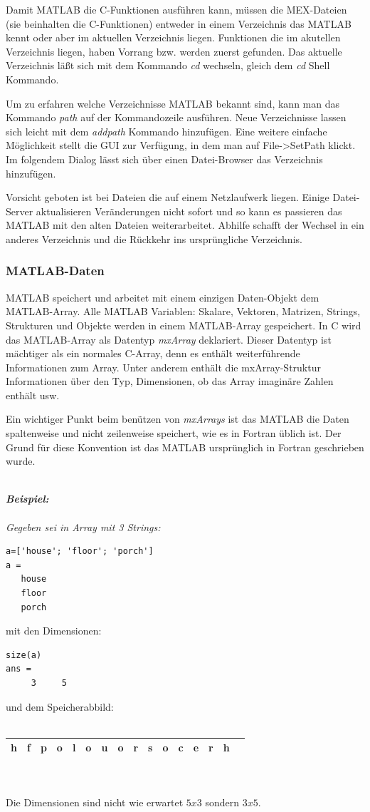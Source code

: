 \documentclass[10pt, bigheadings]{scrartcl}
\begin{document}
Damit MATLAB die C-Funktionen ausführen kann, müssen die MEX-Dateien
(sie beinhalten die C-Funktionen) entweder in einem Verzeichnis das
MATLAB kennt oder aber im aktuellen Verzeichnis liegen. Funktionen die
im akutellen Verzeichnis liegen, haben Vorrang bzw. werden zuerst
gefunden. Das aktuelle Verzeichnis läßt sich mit dem Kommando \textit{cd}
wechseln, gleich dem \textit{cd} Shell Kommando.

Um zu erfahren welche Verzeichnisse MATLAB bekannt sind, kann man das
Kommando \textit{path} auf der Kommandozeile ausführen. Neue Verzeichnisse
lassen sich leicht mit dem \textit{addpath} Kommando hinzufügen. Eine
weitere einfache Möglichkeit stellt die GUI zur Verfügung, in dem man 
auf File->SetPath klickt. Im folgendem Dialog lässt sich über einen 
Datei-Browser das Verzeichnis hinzufügen. 	

Vorsicht geboten ist bei Dateien die auf einem Netzlaufwerk liegen. Einige
Datei-Server aktualisieren  Veränderungen nicht sofort und so kann es passieren
das MATLAB mit den alten Dateien weiterarbeitet. Abhilfe schafft der Wechsel
in ein anderes Verzeichnis und die Rückkehr ins ursprüngliche Verzeichnis.

\subsubsection*{MATLAB-Daten}
MATLAB speichert und arbeitet mit einem einzigen Daten-Objekt dem MATLAB-Array.
Alle MATLAB Variablen: Skalare, Vektoren, Matrizen, Strings, Strukturen und
Objekte werden in einem MATLAB-Array gespeichert. In C wird das MATLAB-Array als
Datentyp \textit{mxArray} deklariert. Dieser Datentyp ist mächtiger als ein
normales C-Array, denn es enthält weiterführende Informationen zum Array. Unter
anderem enthält die mxArray-Struktur Informationen über den Typ, Dimensionen, ob
das Array imaginäre Zahlen enthält usw.

Ein wichtiger Punkt beim benützen von \textit{mxArrays} ist das MATLAB
die Daten spaltenweise und nicht zeilenweise speichert, wie es in Fortran
üblich ist. Der Grund für diese Konvention ist das MATLAB ursprünglich in
Fortran geschrieben wurde.\\\\
{\it
\textbf{Beispiel:}\\\\
Gegeben sei in Array mit 3 Strings:
\begin{verbatim}
a=['house'; 'floor'; 'porch']
a =
   house
   floor
   porch
\end{verbatim}
mit den Dimensionen:
\begin{verbatim}
size(a)
ans =
     3     5
\end{verbatim}
und dem Speicherabbild:\\\\
\begin{tabular}{|l|l|l|l|l|l|l|l|l|l|l|l|l|l|l|l|}
\hline
h & f & p & o & l & o & u & o & r & s & o & c & e & r & h \\
\hline
\end{tabular}\\\\
Die Dimensionen sind nicht wie erwartet $5x3$ sondern $3x5$.
}
\end{document}

